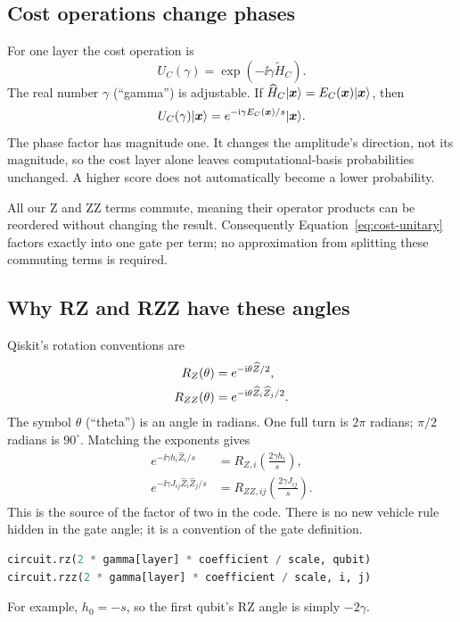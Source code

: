 \subsection{Cost operations change phases}
For one layer the cost operation is
\begin{equation}\label{eq:cost-unitary}
U_C(\gamma)=\exp\!\left(-\ii\gamma\widetilde H_C\right).
\end{equation}
The real number $\gamma$ (``gamma'') is adjustable. If
$\widehat H_C\lvert \boldsymbol{x}\rangle=E_C(\boldsymbol{x})\lvert \boldsymbol{x}\rangle$, then
\begin{equation}
U_C(\gamma)\lvert \boldsymbol{x}\rangle
=e^{-\mathrm{i}\gamma E_C(\boldsymbol{x})/s}\lvert \boldsymbol{x}\rangle.
\end{equation}
The phase factor has magnitude one. It changes the amplitude's direction, not
its magnitude, so the cost layer alone leaves computational-basis probabilities
unchanged. A higher score does not automatically become a lower probability.

All our Z and ZZ terms commute, meaning their operator products can be reordered
without changing the result. Consequently Equation~\eqref{eq:cost-unitary}
factors exactly into one gate per term; no approximation from splitting these
commuting terms is required.

\subsection{Why RZ and RZZ have these angles}
Qiskit's rotation conventions are\cite{rz,rzz}
\begin{align}
R_{Z}(\theta)&=e^{-\mathrm{i}\theta\widehat Z/2},\\
R_{ZZ}(\theta)&=e^{-\mathrm{i}\theta\widehat Z_i\widehat Z_j/2}.
\end{align}
The symbol $\theta$ (``theta'') is an angle in radians. One full turn is $2\pi$
radians; $\pi/2$ radians is $90^\circ$. Matching the exponents gives
\begin{align}
e^{-\ii\gamma h_i\widehat Z_i/s}
&=R_{Z,i}\!\left(\frac{2\gamma h_i}{s}\right),\\
e^{-\ii\gamma J_{ij}\widehat Z_i\widehat Z_j/s}
&=R_{ZZ,ij}\!\left(\frac{2\gamma J_{ij}}s\right).
\end{align}
This is the source of the factor of two in the code. There is no new vehicle
rule hidden in the gate angle; it is a convention of the gate definition.
\begin{lstlisting}[language=Python]
circuit.rz(2 * gamma[layer] * coefficient / scale, qubit)
circuit.rzz(2 * gamma[layer] * coefficient / scale, i, j)
\end{lstlisting}
For example, $h_0=-s$, so the first qubit's RZ angle is simply $-2\gamma$.

